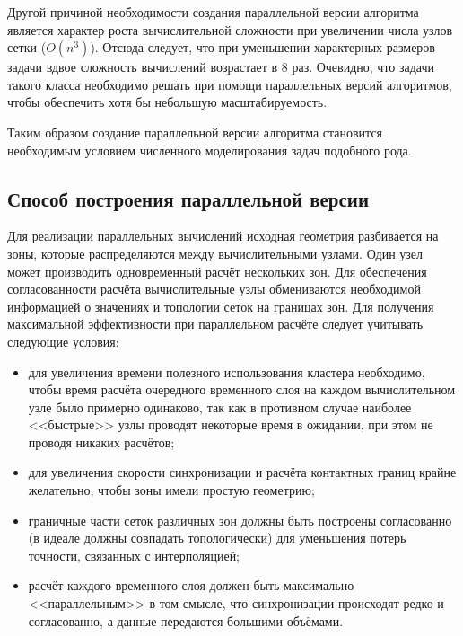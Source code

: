 Другой причиной необходимости создания параллельной версии алгоритма является характер роста вычислительной сложности при увеличении числа узлов сетки ($O(n^3)$). Отсюда следует, что при уменьшении характерных размеров задачи вдвое сложность вычислений возрастает в 8 раз. Очевидно, что задачи такого класса необходимо решать при помощи параллельных версий алгоритмов, чтобы обеспечить хотя бы небольшую масштабируемость.

Таким образом создание параллельной версии алгоритма становится необходимым условием численного моделирования задач подобного рода.

\subsection{Способ построения параллельной версии}
Для реализации параллельных вычислений исходная геометрия разбивается на зоны, которые распределяются между вычислительными узлами. Один узел может производить одновременный расчёт нескольких зон. Для обеспечения согласованности расчёта вычислительные узлы обмениваются необходимой информацией о значениях и топологии сеток на границах зон. Для получения максимальной эффективности при параллельном расчёте следует учитывать следующие условия:
\begin{itemize}
	\item для увеличения времени полезного использования кластера необходимо, чтобы время расчёта очередного временного слоя на каждом вычислительном узле было примерно одинаково, так как в противном случае наиболее <<быстрые>> узлы проводят некоторые время в ожидании, при этом не проводя никаких расчётов;
	\item для увеличения скорости синхронизации и расчёта контактных границ крайне желательно, чтобы зоны имели простую геометрию;
	\item граничные части сеток различных зон должны быть построены согласованно (в идеале должны совпадать топологически) для уменьшения потерь точности, связанных с интерполяцией;
	\item расчёт каждого временного слоя должен быть максимально <<параллельным>> в том смысле, что синхронизации происходят редко и согласованно, а данные передаются большими объёмами.
\end{itemize}
